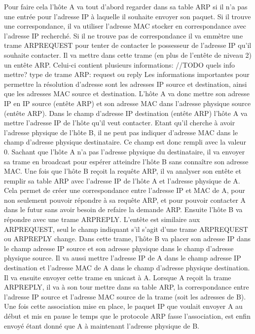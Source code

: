 Pour faire cela l'hôte A va tout d'abord regarder dans sa table ARP si il n'a
pas une entrée pour l'adresse IP à laquelle il souhaite envoyer son paquet. Si
il trouve une correspondance, il va utiliser l'adresse MAC stocker en
correspondance avec l'adresse IP recherché.  Si il ne trouve pas de
correspondance il va emmètre une trame ARPREQUEST pour tenter de contacter le
possesseur de l'adresse IP qu'il souhaite contacter. Il va mettre dans cette
trame (en plus de l'entête de niveau 2) un entête ARP. Celui-ci contient
plusieurs informations:
//TODO quels info mettre? type de trame ARP: request ou reply
Les informations importantes pour permettre la résolution d'adresse sont les
adresses IP source et destination, ainsi que les adresses MAC source et
destination.  L'hôte A va donc mettre son adresse IP en IP source (entête ARP)
et son adresse MAC dans l'adresse physique source (entête ARP). Dans le champ
d'adresse IP destination (entête ARP) l'hôte A va mettre l'adresse IP de l'hôte
qu'il veut contacter. Etant qu'il cherche à avoir l'adresse physique de l'hôte
B, il ne peut pas indiquer d'adresse MAC dans le champ d'adresse physique
destinataire. Ce champ est donc rempli avec la valeur 0.  Sachant que l'hôte A
n'a pas l'adresse physique du destinataire, il va envoyer sa trame en broadcast
pour espérer atteindre l'hôte B sans connaître son adresse MAC.  Une fois que
l'hôte B reçoit la requête ARP, il va analyser son entête et remplir sa table
ARP avec l'adresse IP de l'hôte A et l'adresse physique de A. Cela permet de
créer une correspondance entre l'adresse IP et MAC de A, pour non seulement
pouvoir répondre à sa requête ARP, et pour pouvoir contacter A dans le futur
sans avoir besoin de refaire la demande ARP.  Ensuite l'hôte B va répondre avec
une trame ARPREPLY. L'entête est similaire aux ARPREQUEST, seul le champ
indiquant s'il s'agit d'une trame ARPREQUEST ou ARPREPLY change. Dans cette
trame, l'hôte B va placer son adresse IP dans le champ adresse IP source et son
adresse physique dans le champ d'adresse physique source. Il va aussi mettre
l'adresse IP de A dans le champ adresse IP destination et l'adresse MAC de A
dans le champ d'adresse physique destination. Il va ensuite envoyer cette trame
en unicast à A.  Lorsque A reçoit la trame ARPREPLY, il va à son tour mettre
dans sa table ARP, la correspondance entre l'adresse IP source et l'adresse MAC
source de la trame (soit les adresses de B).  Une fois cette association mise
en place, le paquet IP que voulait envoyer A au début et mis en pause le temps
que le protocole ARP fasse l'association, est enfin envoyé étant donné que A à
maintenant l'adresse physique de B.

